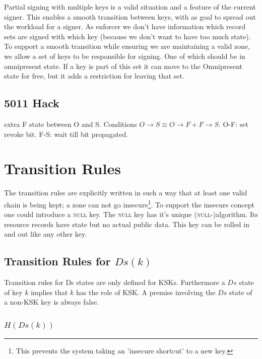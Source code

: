 \documentclass[twoside,english, a4paper]{article}
\newcommand{\mathbox}[1]{#1}
\begin{document}
Partial signing with multiple keys is a valid situation and a 
feature of the current signer. This enables a smooth transition 
between keys, with as goal to spread out the workload for a signer. 
As enforcer we don't have information which record sets are signed 
with which key (because we don't want to have too much state). To 
support a smooth transition while ensuring we are maintaining a 
valid zone, we allow a set of keys to be 
responsible for signing. One of which should be in omnipresent state.
If a key is part of this set it can move to the Omnipresent state for 
free, but it adds a restriction for leaving that set.

\subsection{5011 Hack}

extra F state between O and S. Conditions $O\rightarrow S \equiv O\rightarrow F + F\rightarrow S$.
O-F: set revoke bit. F-S: wait till bit propagated. 

\section{Transition Rules}

The transition rules are explicitly written in such a way that at 
least one valid chain is being kept; a zone can not go insecure\footnote{
This prevents the system taking an 'insecure shortcut' to a new key.}. To support the insecure concept one could introduce a 
\textsc{null} key. The \textsc{null} key has it's unique (\textsc 
{null}-)algorithm. Its resource records have state but no actual 
public data. This key can be rolled in and out like any other key.

\subsection{Transition Rules for $Ds(k)$}

Transition rules for Ds states are only defined for KSKs. Furthermore
a $Ds$ state of key $k$ implies that $k$ has the role of KSK. A premise 
involving the $Ds$ state of a non-KSK key is always false.

\subsubsection{$H(Ds(k))$}



	
\end{document}
